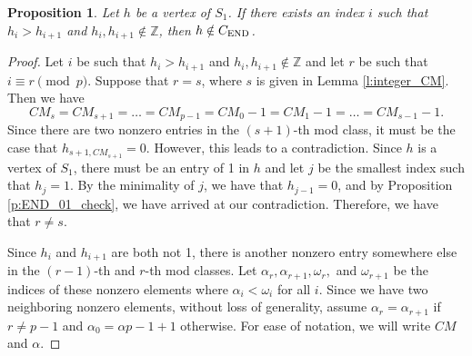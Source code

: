 \documentclass[12pt]{amsart}
\newtheorem{prop}[thm]{Proposition}
\theoremstyle{definition}
\numberwithin{equation}{section}
\renewcommand\>{\rangle}
\newcommand\<{\langle}
\newcommand\0{\mathbf{0}}
\newcommand\ZZ{\mathbb{Z}}
\newcommand{\CEND}{C_\textnormal{END}}
\begin{document}
\begin{prop}\label{p:END_consec_nonint_check}
	Let $h$ be a vertex of $S_1$. If there exists an index $i$ such that $h_{i} > h_{i+1}$ and $h_{i}, h_{i+1} \notin \ZZ$, then $h \notin \CEND$.
\end{prop}
\begin{proof}
	Let $i$ be such that $h_{i} > h_{i+1}$ and $h_{i}, h_{i+1} \notin \ZZ$ and let $r$ be such that $i \equiv r \pmod p$. 
	Suppose that $r = s$, where $s$ is given in Lemma \ref{l:integer_CM}. Then we have 
	\[CM_s = CM_{s+1} = \dots = CM_{p-1} = CM_0 - 1 = CM_{1} -1 = \dots = CM_{s-1} - 1. \] 
	Since there are two nonzero entries in the $(s+1)$-th mod class, it must be the case that $h_{s+1,CM_{s+1}} = 0$. However, this leads to a contradiction. Since $h$ is a vertex of $S_1$, there must be an entry of 1 in $h$ and let $j$ be the smallest index such that $h_j = 1$. By the minimality of $j$, we have that $h_{j-1} = 0$, and by Proposition \ref{p:END_01_check}, we have arrived at our contradiction. Therefore, we have that $r \neq s$.
	
	Since $h_{i}$ and $h_{i+1}$ are both not 1, there is another nonzero entry somewhere else in the $(r-1)$-th and $r$-th mod classes. Let $\alpha_{r}, \alpha_{r+1}, \omega_{r},$ and $\omega_{r+1}$ be the indices of these nonzero elements where $\alpha_{i} < \omega_{i}$ for all $i$. 
	Since we have two neighboring nonzero elements, without loss of generality, assume $\alpha_{r} = \alpha_{r+1}$ if $r \neq p-1$ and $\alpha_0 = \alpha{p-1} + 1$ otherwise.
 	For ease of notation, we will write $CM$ and $\alpha$.
	

\end{proof}
\end{document}
